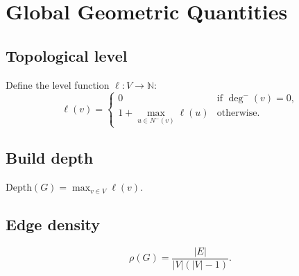 \section{Global Geometric Quantities}

\subsection{Topological level}

\begin{definition}
Define the level function $\ell \colon V \to \mathbb{N}$:
\[
  \ell(v) =
  \begin{cases}
    0 & \text{if } \deg^-(v) = 0, \\
    1 + \max_{u \in N^-(v)} \ell(u) & \text{otherwise}.
  \end{cases}
\]
\end{definition}

\subsection{Build depth}

\begin{definition}
$\mathrm{Depth}(G) = \max_{v \in V} \ell(v)$.
\end{definition}

\subsection{Edge density}

\begin{definition}
\[
  \rho(G) = \frac{|E|}{|V|(|V|-1)}.
\]
\end{definition}
